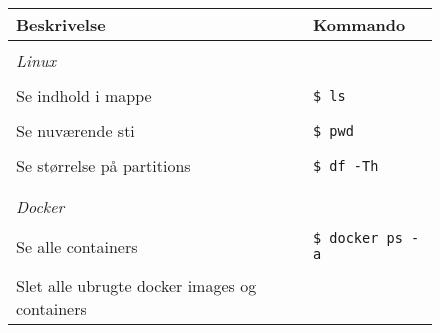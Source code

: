 \begin{figure}[H]
    \centering
    \begin{tabular}{l l}
        \textbf{Beskrivelse} & \textbf{Kommando} \\
        \hline
        & \\
        \textit{Linux} & \\
        & \\
        \begin{minipage}
            {0.5\textwidth}
            Se indhold i mappe
        \end{minipage}& 
        \begin{minipage}
            {0.5\textwidth}
            \texttt{\$ ls}
        \end{minipage} \\
        & \\
        \begin{minipage}
            {0.5\textwidth}
            Se nuværende sti
        \end{minipage}& 
        \begin{minipage}
            {0.5\textwidth}
            \texttt{\$ pwd}
        \end{minipage} \\
        & \\
        \begin{minipage}
            {0.5\textwidth}
            Se størrelse på partitions
        \end{minipage}& 
        \begin{minipage}
            {0.5\textwidth}
            \texttt{\$ df -Th}
        \end{minipage} \\
        & \\
        \hline
        & \\
        \textit{Docker} & \\
        & \\
        \begin{minipage}
            {0.5\textwidth}
            Se alle containers
        \end{minipage}&
        \begin{minipage}
            {0.5\textwidth}
            \texttt{\$ docker ps -a}
        \end{minipage} \\
        & \\
        \begin{minipage}
            {0.5\textwidth}
            Slet alle ubrugte docker images og containers

\end{minipage}
\end{tabular}
\end{figure}
